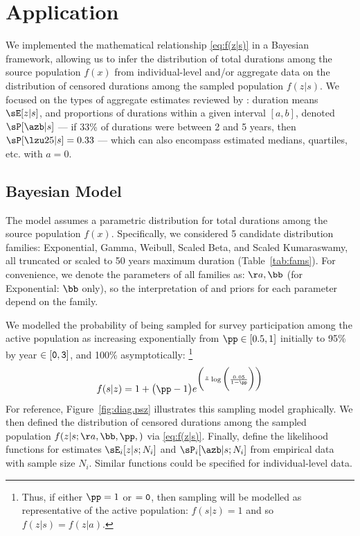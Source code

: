 \section{Application}\label{app}
We implemented the mathematical relationship \eqref{eq:f(z|s)}
in a Bayesian framework, allowing us to infer
the distribution of total durations among the source population $f(x)$
from individual-level and/or aggregate data on
the distribution of censored durations among the sampled population $f(z|s)$.
We focused on the types of aggregate estimates reviewed by \citet{Fazito2012}:
duration means $\sE[z|s]$, and
proportions of durations within a given interval $[a,b]$, denoted $\sP[\azb|s]$
--- \eg if 33\% of durations were between 2 and 5 years, then $\sP[\lzu25|s] = 0.33$ ---
which can also encompass estimated medians, quartiles, etc. with $a=0$.
\subsection{Bayesian Model}
The model assumes a parametric distribution for
total durations among the source population $f(x)$.
Specifically, we considered 5 candidate distribution families:
Exponential, Gamma, Weibull, Scaled Beta, and Scaled Kumaraswamy,
all truncated or scaled to 50 years maximum duration (Table~\ref{tab:fams}).
For convenience, we denote the parameters of all families as: $\aa,\bb$
(for Exponential: $\bb$ only),
so the interpretation of and priors for each parameter depend on the family.
\par
We modelled the probability of
being sampled for survey participation among the active population as
increasing exponentially from $\pp \in [0.5,1]$ initially
to 95\% by year $\tt \in [0,3]$, and 100\% asymptotically:%
\footnote{Thus, if either $\pp = 1$ or $\tt = 0$,
  then sampling will be modelled as representative of the active population:
  $f(s|z) = 1$ and so $f(z|s) = f(z|a)$.}
\begin{equation}
  f(s|z) = 1 + \big(\pp-1\big)
    e^{\bigg(\frac{z}{\tt}\log\bigg(\frac{0.05}{1-\pp}\bigg)\bigg)}
  \label{eq:f(s|z)}
\end{equation}
For reference, Figure~\ref{fig:diag.psz} illustrates this sampling model graphically.
We then defined the distribution of censored durations among the sampled population
$f(z|s;\aa,\bb,\pp,\tt)$ via \eqref{eq:f(z|s)}.
Finally,  define the likelihood functions for
estimates $\sE_i[z|s;N_i]$ and $\sP_i[\azb|s;N_i]$
from empirical data with sample size $N_i$.
Similar functions could be specified for individual-level data.
